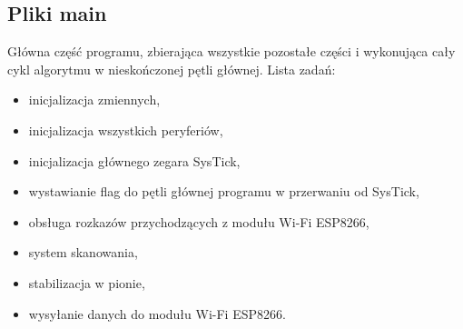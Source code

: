 \documentclass[a4paper,12pt,twoside,openany]{report}
\begin{document}
\newpage
\subsection{Pliki main}

Główna część programu, zbierająca wszystkie pozostałe części i wykonująca cały cykl algorytmu w nieskończonej pętli głównej. Lista zadań:
\begin{itemize}
\item inicjalizacja zmiennych,
\item inicjalizacja wszystkich peryferiów,
\item inicjalizacja głównego zegara SysTick,
\item wystawianie flag do pętli głównej programu w przerwaniu od SysTick,
\item obsługa rozkazów przychodzących z modułu Wi-Fi ESP8266,
\item system skanowania,
\item stabilizacja w pionie,
\item wysyłanie danych do modułu Wi-Fi ESP8266.
\end{itemize}
\end{document}
